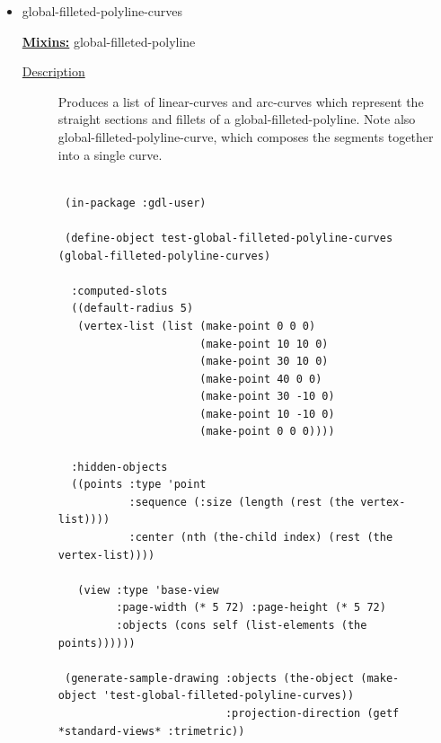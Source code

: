 \documentclass [11pt]{book}
\begin{document}
\begin{itemize}
\item {}global-filleted-polyline-curves


\textbf{
\underline{Mixins:}} global-filleted-polyline





\begin{description}

\item [
\underline{Description}]


Produces a list of linear-curves and arc-curves which represent the straight sections
and fillets of a global-filleted-polyline. Note also global-filleted-polyline-curve, which composes the segments together 
into a single curve.



\end{description}




\begin{figure}
\begin{lrbox}{\boxedverb}
\begin{minipage}{\linewidth}
{\small

\begin{verbatim}

 (in-package :gdl-user)

 (define-object test-global-filleted-polyline-curves (global-filleted-polyline-curves)
                    
  :computed-slots
  ((default-radius 5)
   (vertex-list (list (make-point 0 0 0)
                      (make-point 10 10 0)
                      (make-point 30 10 0)
                      (make-point 40 0 0)
                      (make-point 30 -10 0)
                      (make-point 10 -10 0)
                      (make-point 0 0 0))))

  :hidden-objects
  ((points :type 'point
           :sequence (:size (length (rest (the vertex-list))))
           :center (nth (the-child index) (rest (the vertex-list))))

   (view :type 'base-view
         :page-width (* 5 72) :page-height (* 5 72)
         :objects (cons self (list-elements (the points))))))

 (generate-sample-drawing :objects (the-object (make-object 'test-global-filleted-polyline-curves))
                          :projection-direction (getf *standard-views* :trimetric))


\end{verbatim}}
\end{minipage}
\end{lrbox}
\fbox{\usebox{\boxedverb}}


\end{figure}
\end{itemize}
\end{document}
